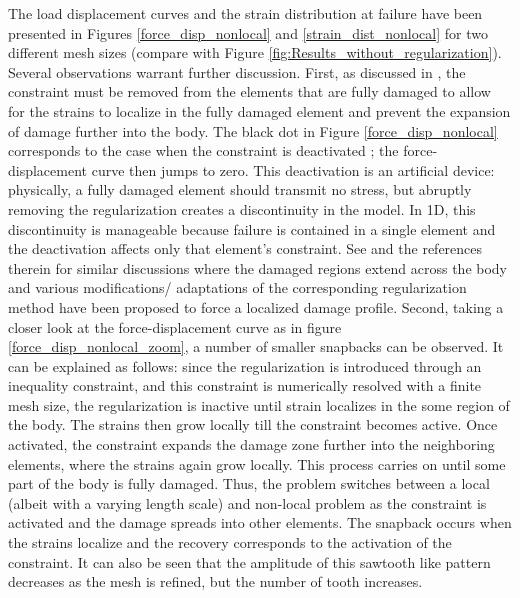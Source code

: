 \documentclass[10pt]{cas-sc}
\newcommand{\deleted}[1]{}
\newcommand{\added}[1]{#1}
\begin{document}
The load displacement curves and the strain distribution at failure have been presented in Figures \ref{force_disp_nonlocal} and \ref{strain_dist_nonlocal} for two different mesh sizes (compare with Figure \ref{fig:Results_without_regularization}). Several observations warrant further discussion. First, as discussed in \cite{Kamasamudram2023}, the constraint must be removed from the elements that are fully damaged to allow for the strains to localize in the fully damaged element and prevent the expansion of damage further into the body. The black dot in Figure \ref{force_disp_nonlocal} corresponds to the case when the constraint is deactivated \deleted{- the force displacement curve suddenly jumps to zero force. This situation is trivial in 1D, but is susceptible to cause convergence issues in 2D.}\added{; the force-displacement curve then jumps to zero. This deactivation is an artificial device: physically, a fully damaged element should transmit no stress, but abruptly removing the regularization creates a discontinuity in the model. In 1D, this discontinuity is manageable because failure is contained in a single element and the deactivation affects only that element's constraint.} See \cite{Geers1998,Cabot2014,le2018strain} and the references therein for similar discussions where the damaged regions extend across the body and various modifications/ adaptations of the corresponding regularization method have been proposed to force a localized damage profile. Second, taking a closer look at the force-displacement curve as in figure \ref{force_disp_nonlocal_zoom}, a number of smaller snapbacks can be observed. It can be explained as follows: since the regularization is introduced through an inequality constraint, and this constraint is numerically resolved with a finite mesh size, the regularization is inactive until strain localizes in the some region of the body. The strains then grow locally till the constraint becomes active. Once activated, the constraint expands the damage zone further into the neighboring elements, where the strains again grow locally. This process carries on until some part of the body is fully damaged. Thus, the problem switches between a local (albeit with a varying length scale) and non-local problem as the constraint is activated and the damage spreads into other elements. The snapback occurs when the strains localize and the recovery corresponds to the activation of the constraint. It can also be seen that the amplitude of this sawtooth like pattern decreases as the mesh is refined, but the number of tooth increases.
\end{document}
